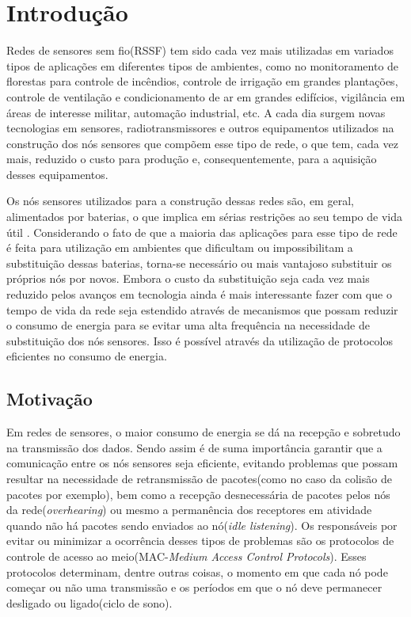 \section{Introdução}

Redes de sensores sem fio(RSSF) tem sido cada vez mais utilizadas em variados tipos de aplicações em diferentes tipos de ambientes, como no monitoramento de florestas para controle de incêndios, controle de irrigação em grandes plantações, controle de ventilação e condicionamento de ar em grandes edifícios, vigilância em áreas de interesse militar, automação industrial, etc. A cada dia surgem novas tecnologias em sensores, radiotransmissores e outros equipamentos utilizados na construção dos nós sensores que compõem esse tipo de rede, o que tem, cada vez mais, reduzido o custo para produção e, consequentemente, para a aquisição desses equipamentos.

Os nós sensores utilizados para a construção dessas redes são, em geral, alimentados por baterias, o que implica em sérias restrições ao seu tempo de vida útil \cite{Akyildiz2002a}. Considerando o fato de que a maioria das aplicações para esse tipo de rede é feita para utilização em ambientes que dificultam ou impossibilitam a substituição dessas baterias, torna-se necessário ou mais vantajoso substituir os próprios nós por novos. Embora o custo da substituição seja cada vez mais reduzido pelos avanços em tecnologia ainda é mais interessante fazer com que o tempo de vida da rede seja estendido através de mecanismos que possam reduzir o consumo de energia para se evitar uma alta frequência na necessidade de substituição dos nós sensores. Isso é possível através da utilização de protocolos eficientes no consumo de energia. 

\subsection{Motivação}

Em redes de sensores, o maior consumo de energia se dá na recepção e sobretudo na transmissão dos dados. Sendo assim é de suma importância garantir que a comunicação entre os nós sensores seja eficiente, evitando problemas que possam resultar na necessidade de retransmissão de pacotes(como no caso da colisão de pacotes por exemplo), bem como a recepção desnecessária de pacotes pelos nós da rede(\emph{overhearing}) ou mesmo a permanência dos receptores em atividade quando não há pacotes sendo enviados ao nó(\emph{idle listening}). Os responsáveis por evitar ou minimizar a ocorrência desses tipos de problemas são os protocolos de controle de acesso ao meio(MAC-\emph{Medium Access Control Protocols}). Esses protocolos determinam, dentre outras coisas, o momento em que cada nó pode começar ou não uma transmissão e os períodos em que o nó deve permanecer desligado ou ligado(ciclo de sono).

